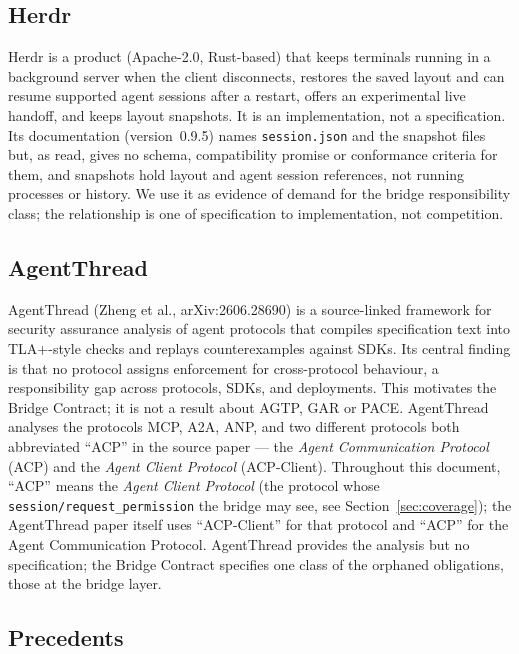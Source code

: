 \subsection{Herdr}

Herdr \cite{herdr-product} is a product (Apache-2.0, Rust-based) that
keeps terminals running in a background server when the client
disconnects, restores the saved layout and can resume supported agent
sessions after a restart, offers an experimental live handoff, and keeps
layout snapshots. It is an implementation, not a specification. Its
documentation (version~0.9.5) names \texttt{session.json} and the
snapshot files but, as read, gives no schema, compatibility promise or
conformance criteria for them, and snapshots hold layout and agent session
references, not running processes or history. We use it as
evidence of demand for the bridge responsibility class; the relationship
is one of specification to implementation, not competition.

\subsection{AgentThread}\label{sec:rw-agtp-thread}

AgentThread \cite{zheng2026formal} (Zheng et al., arXiv:2606.28690) is a
source-linked framework for security assurance analysis of agent
protocols that compiles specification text into TLA+-style checks and
replays counterexamples against SDKs. Its central finding is that no
protocol assigns enforcement for cross-protocol behaviour, a
responsibility gap across protocols, SDKs, and deployments. This
motivates the Bridge Contract; it is not a result about AGTP, GAR or PACE.
AgentThread analyses the protocols MCP, A2A, ANP, and two different
protocols both abbreviated ``ACP'' in the source paper --- the
\emph{Agent Communication Protocol} (ACP) and the \emph{Agent Client
Protocol} (ACP-Client). Throughout this document, ``ACP'' means the
\emph{Agent Client Protocol} (the protocol whose
\texttt{session/request\_permission} the bridge may see, see
Section~\ref{sec:coverage}); the AgentThread paper itself uses
``ACP-Client'' for that protocol and ``ACP'' for the Agent Communication
Protocol. AgentThread provides the
analysis but no specification; the Bridge Contract specifies one class of
the orphaned obligations, those at the bridge layer.

\subsection{Precedents}

